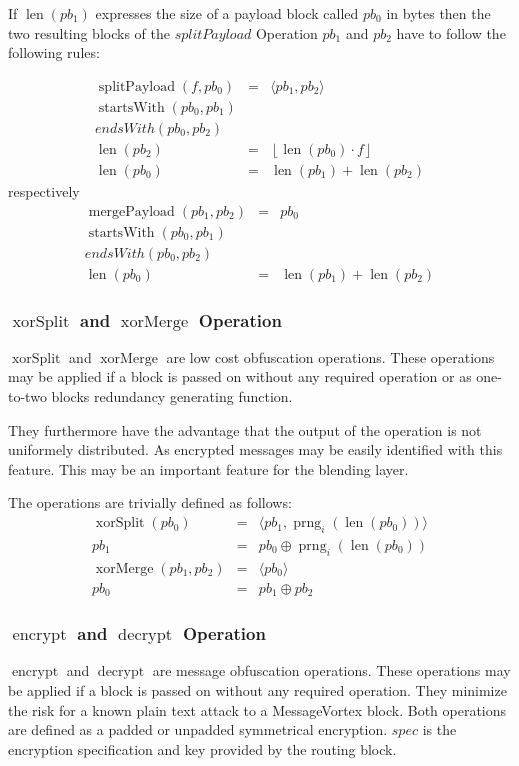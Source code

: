 \documentclass[9pt,journal,compsoc]{IEEEtran}
\DeclareMathOperator{\prng}{prng}
\DeclareMathOperator{\len}{len}
\DeclareMathOperator{\xorSplit}{xorSplit}
\DeclareMathOperator{\xorMerge}{xorMerge}
\DeclareMathOperator{\splitPayload}{splitPayload}
\DeclareMathOperator{\mergePayload}{mergePayload}
\DeclareMathOperator{\startsWith}{startsWith}
\DeclareMathOperator{\encrypt}{encrypt}
\DeclareMathOperator{\decrypt}{decrypt}
\begin{document}
If $\len(pb_1)$ expresses the size of a payload block called $pb_0$ in bytes then the two resulting blocks of the $splitPayload$ Operation $pb_1$ and $pb_2$ have to follow the following rules:

\begin{eqnarray}
\splitPayload(f, pb_0) & = &\langle pb_1, pb_2 \rangle\\
\startsWith(pb_0, pb_1)\\
endsWith(pb_0, pb_2)\\
\len(pb_2) & = & \left\lfloor \len(pb_0)\cdot f\right \rfloor\\
\len(pb_0) & = & \len(pb_1) + \len(pb_2)
\end{eqnarray}
respectively
\begin{eqnarray}
\mergePayload(pb_1, pb_2) & = & pb_0 \\
\startsWith(pb_0, pb_1)\\
endsWith(pb_0, pb_2)\\
\len(pb_0) & = & \len(pb_1) + \len(pb_2)
\end{eqnarray}
 
\subsubsection{$\xorSplit$ and $\xorMerge$ Operation}
$\xorSplit$ and $\xorMerge$ are low cost obfuscation operations. These operations may be applied if a block is passed on without any required operation or as one-to-two blocks redundancy generating function. 

They furthermore have the advantage that the output of the operation is not uniformely distributed. As encrypted messages may be easily identified with this feature. This may be an important feature for the blending layer.

The operations are trivially defined as follows:
\begin{eqnarray}
\xorSplit(pb_0) & = &\langle pb_1, \prng_i(\len(pb_0)) \rangle\\
pb_1 & = & pb_0 \oplus \prng_i(\len(pb_0))\\
\xorMerge(pb_1,pb_2) & = &\langle pb_0 \rangle\\
pb_0 & = & pb_1 \oplus pb_2
\end{eqnarray}

\subsubsection{$\encrypt$ and $\decrypt$ Operation}
$\encrypt$ and $\decrypt$ are message obfuscation operations. These operations may be applied if a block is passed on without any required operation. They minimize the risk for a known plain text attack to a MessageVortex block. Both operations are defined as a padded or unpadded symmetrical encryption. $spec$ is the encryption specification and key provided by the routing block.
\end{document}
